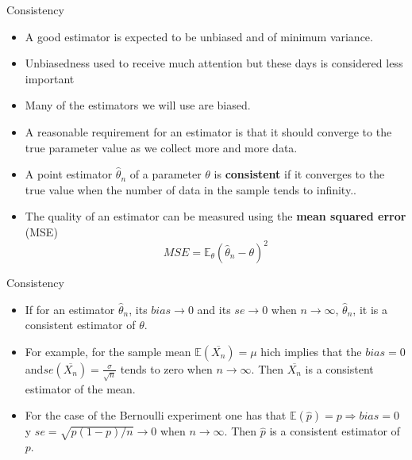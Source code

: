 \documentclass[handout]{beamer}
\begin{document}
\begin{frame}{Consistency}

\scriptsize{

\begin{itemize}
\item A good estimator is expected to be unbiased and of minimum variance.

\item Unbiasedness used to receive much attention but these days is considered less important

\item Many of the estimators we will use are biased. 

\item A reasonable requirement for an estimator is that it should converge to the true parameter value as we collect more and more data.

\item A point estimator $\hat{\theta}_n$ of a parameter $\theta$ is \textbf{consistent}  if it converges to the true value when the number of data in the sample tends to infinity..
\item The quality of an estimator can be measured using the  \textbf{mean squared error} (MSE)
\begin{displaymath}
MSE = \mathbb{E}_{\theta}(\hat{\theta}_n - \theta)^2 
\end{displaymath}

\end{itemize}

} 
\end{frame}



\begin{frame}{Consistency}

\scriptsize{

\begin{itemize}
\item If for an estimator $\hat{\theta}_n$, its $bias \rightarrow 0$ and its $se \rightarrow 0$ when $n\rightarrow \infty$, $\hat{\theta}_n$, it is a consistent estimator of $\theta$.

\item For example, for the sample mean $\mathbb{E}(\overline{X_{n}})=\mu$ hich implies that the $bias =0$ and$se(\overline{X_{n}}) = \frac{\sigma}{\sqrt{n}}$  tends to zero when $n\rightarrow \infty$. Then $\overline{X_{n}}$ is a consistent estimator of the mean.  

\item For the case of the Bernoulli experiment one has that  $\mathbb{E}(\hat{p})=p \Rightarrow bias=0$ y $se = \sqrt{p(1-p)/n} \rightarrow 0$ when $n\rightarrow \infty$. Then  $\hat{p}$ is a consistent estimator of $p$.


\end{itemize}

} 
\end{frame}
\end{document}
